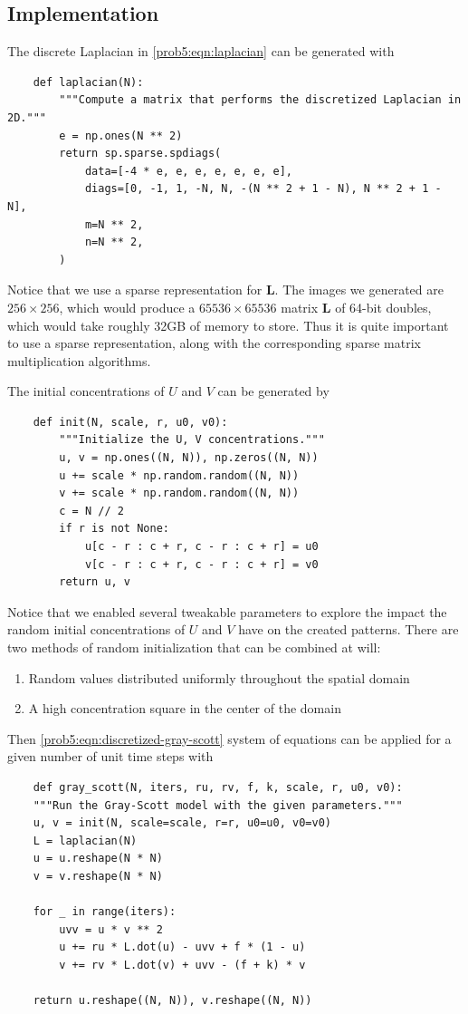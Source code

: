\subsection{Implementation}
The discrete Laplacian in \autoref{prob5:eqn:laplacian} can be generated with
\begin{verbatim}
    def laplacian(N):
        """Compute a matrix that performs the discretized Laplacian in 2D."""
        e = np.ones(N ** 2)
        return sp.sparse.spdiags(
            data=[-4 * e, e, e, e, e, e, e],
            diags=[0, -1, 1, -N, N, -(N ** 2 + 1 - N), N ** 2 + 1 - N],
            m=N ** 2,
            n=N ** 2,
        )
\end{verbatim}
Notice that we use a sparse representation for $\mathbf L$.
The images we generated are $256 \times 256$, which would produce a $65536 \times 65536$ matrix $\mathbf L$ of 64-bit doubles, which would take roughly 32GB of memory to store.
Thus it is quite important to use a sparse representation, along with the corresponding sparse matrix multiplication algorithms.

The initial concentrations of $U$ and $V$ can be generated by
\begin{verbatim}
    def init(N, scale, r, u0, v0):
        """Initialize the U, V concentrations."""
        u, v = np.ones((N, N)), np.zeros((N, N))
        u += scale * np.random.random((N, N))
        v += scale * np.random.random((N, N))
        c = N // 2
        if r is not None:
            u[c - r : c + r, c - r : c + r] = u0
            v[c - r : c + r, c - r : c + r] = v0
        return u, v
\end{verbatim}
Notice that we enabled several tweakable parameters to explore the impact the random initial concentrations of $U$ and $V$ have on the created patterns.
There are two methods of random initialization that can be combined at will:
\begin{enumerate}
    \item Random values distributed uniformly throughout the spatial domain
    \item A high concentration square in the center of the domain
\end{enumerate}

Then \autoref{prob5:eqn:discretized-gray-scott} system of equations can be applied for a given number of unit time steps with
\begin{verbatim}
    def gray_scott(N, iters, ru, rv, f, k, scale, r, u0, v0):
    """Run the Gray-Scott model with the given parameters."""
    u, v = init(N, scale=scale, r=r, u0=u0, v0=v0)
    L = laplacian(N)
    u = u.reshape(N * N)
    v = v.reshape(N * N)

    for _ in range(iters):
        uvv = u * v ** 2
        u += ru * L.dot(u) - uvv + f * (1 - u)
        v += rv * L.dot(v) + uvv - (f + k) * v

    return u.reshape((N, N)), v.reshape((N, N))
\end{verbatim}

